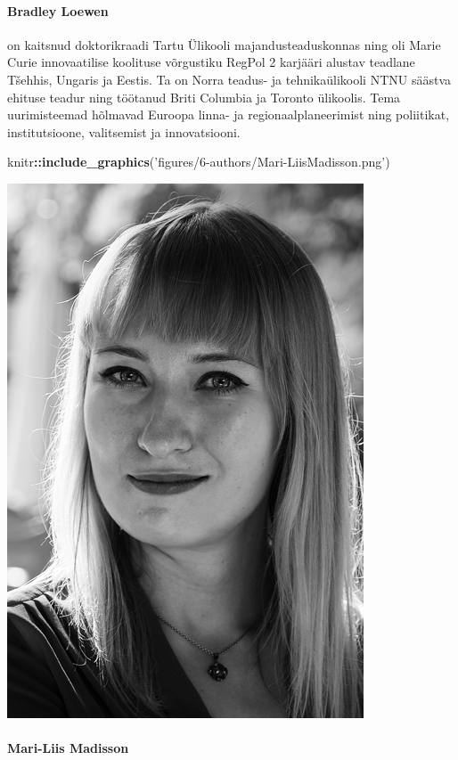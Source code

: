 \documentclass[estonian,]{article}
\newenvironment{Shaded}{\begin{snugshade}}{\end{snugshade}}
\newcommand{\KeywordTok}[1]{\textcolor[rgb]{0.13,0.29,0.53}{\textbf{#1}}}
\newcommand{\NormalTok}[1]{#1}
\newcommand{\OperatorTok}[1]{\textcolor[rgb]{0.81,0.36,0.00}{\textbf{#1}}}
\newcommand{\StringTok}[1]{\textcolor[rgb]{0.31,0.60,0.02}{#1}}
\let\oldparagraph\paragraph
\renewcommand{\paragraph}[1]{\oldparagraph{#1}\mbox{}}
\begin{document}
\hypertarget{bradley-loewen}{%
\paragraph{Bradley Loewen}\label{bradley-loewen}}

on kaitsnud doktorikraadi Tartu Ülikooli majandusteaduskonnas ning oli Marie Curie innovaatilise koolituse võrgustiku RegPol 2 karjääri alustav teadlane Tšehhis, Ungaris ja Eestis. Ta on Norra teadus- ja tehnikaülikooli NTNU säästva ehituse teadur ning töötanud Briti Columbia ja Toronto ülikoolis. Tema uurimisteemad hõlmavad Euroopa linna- ja regionaalplaneerimist ning poliitikat, institutsioone, valitsemist ja innovatsiooni.

\begin{Shaded}
\begin{Highlighting}[]
\NormalTok{knitr}\OperatorTok{::}\KeywordTok{include_graphics}\NormalTok{(}\StringTok{'figures/6-authors/Mari-LiisMadisson.png'}\NormalTok{)}
\end{Highlighting}
\end{Shaded}

\begin{flushleft}\includegraphics[width=0.5\linewidth]{figures/6-authors/Mari-LiisMadisson} \end{flushleft}

\hypertarget{mari-liis-madisson}{%
\paragraph{Mari-Liis Madisson}\label{mari-liis-madisson}}
\end{document}
